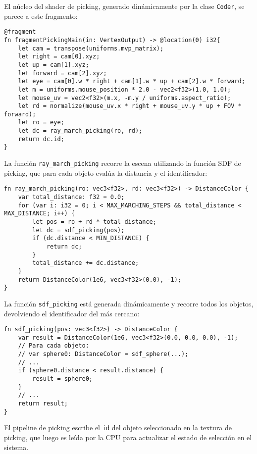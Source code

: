 El núcleo del shader de picking, generado dinámicamente por la clase
\texttt{Coder}, se parece a este fragmento:

\begin{lstlisting}[language=WGSL, caption={Picking shader fragment}]
@fragment
fn fragmentPickingMain(in: VertexOutput) -> @location(0) i32{
    let cam = transpose(uniforms.mvp_matrix);
    let right = cam[0].xyz;
    let up = cam[1].xyz;
    let forward = cam[2].xyz;
    let eye = cam[0].w * right + cam[1].w * up + cam[2].w * forward;
    let m = uniforms.mouse_position * 2.0 - vec2<f32>(1.0, 1.0);
    let mouse_uv = vec2<f32>(m.x, -m.y / uniforms.aspect_ratio);
    let rd = normalize(mouse_uv.x * right + mouse_uv.y * up + FOV * forward);
    let ro = eye;
    let dc = ray_march_picking(ro, rd);
    return dc.id;
}
\end{lstlisting}

La función \texttt{ray\_march\_picking} recorre la escena utilizando la función
SDF de picking, que para cada objeto evalúa la distancia y el identificador:

\begin{lstlisting}[language=WGSL, caption={Ray marching picking loop}]
fn ray_march_picking(ro: vec3<f32>, rd: vec3<f32>) -> DistanceColor {
    var total_distance: f32 = 0.0;
    for (var i: i32 = 0; i < MAX_MARCHING_STEPS && total_distance < MAX_DISTANCE; i++) {
        let pos = ro + rd * total_distance;
        let dc = sdf_picking(pos);
        if (dc.distance < MIN_DISTANCE) {
            return dc;
        }
        total_distance += dc.distance;
    }
    return DistanceColor(1e6, vec3<f32>(0.0), -1);
}
\end{lstlisting}

La función \texttt{sdf\_picking} está generada dinámicamente y recorre todos
los objetos, devolviendo el identificador del más cercano:

\begin{lstlisting}[language=WGSL, caption={SDF picking para todos los objetos}]
fn sdf_picking(pos: vec3<f32>) -> DistanceColor {
    var result = DistanceColor(1e6, vec3<f32>(0.0, 0.0, 0.0), -1);
    // Para cada objeto:
    // var sphere0: DistanceColor = sdf_sphere(...);
    // ...
    if (sphere0.distance < result.distance) {
        result = sphere0;
    }
    // ...
    return result;
}
\end{lstlisting}

El pipeline de picking escribe el \texttt{id} del objeto seleccionado en la
textura de picking, que luego es leída por la CPU para actualizar el estado de
selección en el sistema.